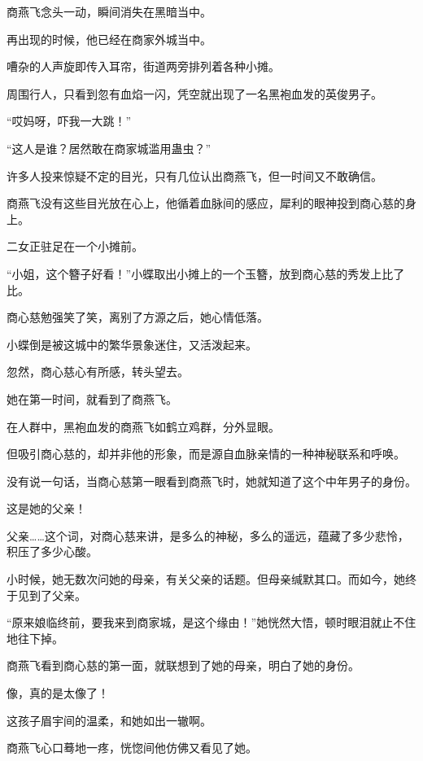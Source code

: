 
\begin{this_body}



商燕飞念头一动，瞬间消失在黑暗当中。

再出现的时候，他已经在商家外城当中。

嘈杂的人声旋即传入耳帘，街道两旁排列着各种小摊。

周围行人，只看到忽有血焰一闪，凭空就出现了一名黑袍血发的英俊男子。

“哎妈呀，吓我一大跳！”

“这人是谁？居然敢在商家城滥用蛊虫？”

许多人投来惊疑不定的目光，只有几位认出商燕飞，但一时间又不敢确信。

商燕飞没有这些目光放在心上，他循着血脉间的感应，犀利的眼神投到商心慈的身上。

二女正驻足在一个小摊前。

“小姐，这个簪子好看！”小蝶取出小摊上的一个玉簪，放到商心慈的秀发上比了比。

商心慈勉强笑了笑，离别了方源之后，她心情低落。

小蝶倒是被这城中的繁华景象迷住，又活泼起来。

忽然，商心慈心有所感，转头望去。

她在第一时间，就看到了商燕飞。

在人群中，黑袍血发的商燕飞如鹤立鸡群，分外显眼。

但吸引商心慈的，却并非他的形象，而是源自血脉亲情的一种神秘联系和呼唤。

没有说一句话，当商心慈第一眼看到商燕飞时，她就知道了这个中年男子的身份。

这是她的父亲！

父亲……这个词，对商心慈来讲，是多么的神秘，多么的遥远，蕴藏了多少悲怜，积压了多少心酸。

小时候，她无数次问她的母亲，有关父亲的话题。但母亲缄默其口。而如今，她终于见到了父亲。

“原来娘临终前，要我来到商家城，是这个缘由！”她恍然大悟，顿时眼泪就止不住地往下掉。

商燕飞看到商心慈的第一面，就联想到了她的母亲，明白了她的身份。

像，真的是太像了！

这孩子眉宇间的温柔，和她如出一辙啊。

商燕飞心口蓦地一疼，恍惚间他仿佛又看见了她。


\end{this_body}
